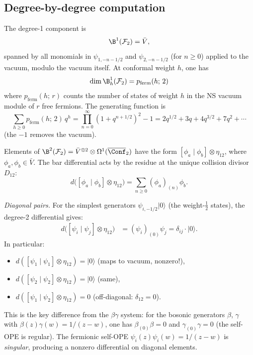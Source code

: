 \subsection{Degree-by-degree computation}

\begin{computation}[Degree 1]
\label{comp:fermion-deg1}
The degree-1 component is
\[
\B^1(\mathcal{F}_2) = \bar{V},
\]
spanned by all monomials in $\psi_{1,-n-1/2}$ and $\psi_{2,-n-1/2}$
(for $n \geq 0$) applied to the vacuum, modulo the vacuum itself.
At conformal weight $h$, one has
\[
\dim \B^1_h(\mathcal{F}_2) = p_{\mathrm{ferm}}(h;\,2)
\]
where $p_{\mathrm{ferm}}(h;\,r)$ counts the number of states of weight $h$
in the NS vacuum module of $r$ free fermions. The generating function is
\begin{equation}\label{eq:fermion-char}
\sum_{h \geq 0} p_{\mathrm{ferm}}(h;\,2)\,q^h
= \prod_{n=0}^{\infty}(1 + q^{n+1/2})^2 - 1
= 2q^{1/2} + 3q + 4q^{3/2} + 7q^2 + \cdots
\end{equation}
(the $-1$ removes the vacuum).
\end{computation}

\begin{computation}
\label{comp:fermion-deg2}
Elements of $\B^2(\mathcal{F}_2) = \bar{V}^{\otimes 2}
\otimes \Omega^1(\overline{\Conf}_2)$ have the form
$[\phi_a \mid \phi_b] \otimes \eta_{12}$, where $\phi_a, \phi_b \in \bar{V}$.
The bar differential acts by the residue at the unique collision divisor $D_{12}$:
\begin{equation}\label{eq:fermion-bar-d2}
d\bigl([\phi_a \mid \phi_b] \otimes \eta_{12}\bigr)
= \sum_{n \geq 0} (\phi_a)_{(n)}\phi_b.
\end{equation}

\emph{Diagonal pairs.}
For the simplest generators $\psi_{i,-1/2}|0\rangle$ (the weight-$\frac{1}{2}$
states), the degree-2 differential gives:
\begin{align}
d\bigl([\psi_i \mid \psi_j] \otimes \eta_{12}\bigr)
&= (\psi_i)_{(0)}\psi_j = \delta_{ij}\cdot |0\rangle.
\label{eq:fermion-d2-simple}
\end{align}
In particular:
\begin{itemize}
\item $d([\psi_1 \mid \psi_1] \otimes \eta_{12}) = |0\rangle$
 \quad (maps to vacuum, nonzero!),
\item $d([\psi_2 \mid \psi_2] \otimes \eta_{12}) = |0\rangle$
 \quad (same),
\item $d([\psi_1 \mid \psi_2] \otimes \eta_{12}) = 0$
 \quad (off-diagonal: $\delta_{12} = 0$).
\end{itemize}

This is the key difference from the $\beta\gamma$ system: for the
bosonic generators $\beta$, $\gamma$ with $\beta(z)\gamma(w) = 1/(z-w)$,
one has $\beta_{(0)}\beta = 0$ and $\gamma_{(0)}\gamma = 0$
(the self-OPE is regular). The fermionic self-OPE
$\psi_i(z)\psi_i(w) = 1/(z-w)$ is \emph{singular}, producing a
nonzero differential on diagonal elements.
\end{computation}

